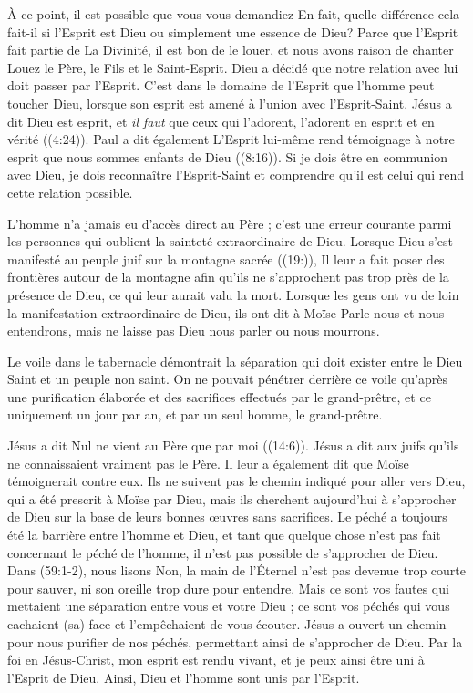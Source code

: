 À ce point, il est possible que vous vous demandiez\frcolon{}
 \Og En fait, quelle différence cela fait-il si l'Esprit est Dieu
 ou simplement une essence de Dieu? \Fg{}
 Parce que l'Esprit fait partie de La Divinité, il est bon de le louer,
 et nous avons raison de chanter\frcolon{}
 \Og Louez le Père, le Fils et le Saint-Esprit. \Fg{}
 Dieu a décidé que notre relation avec lui doit passer par
 l'Esprit. C'est dans le domaine de l'Esprit que l'homme peut toucher Dieu, lorsque
 son esprit est amené à l'union avec l'Esprit-Saint. Jésus a dit\frcolon{}
 \Og Dieu est esprit, et \emph{il faut} que ceux qui l'adorent, l'adorent en esprit
 et en vérité \Fg{} ((4:24)).
 Paul a dit également\frcolon{} \Og L'Esprit lui-même rend témoignage à notre esprit
 que nous sommes enfants de Dieu \Fg{} ((8:16)).
 Si je dois être en communion avec Dieu, je dois reconnaître l'Esprit-Saint
 et comprendre qu'il est celui qui rend cette relation possible.

L'homme n'a jamais eu d'accès direct au Père ; c'est une erreur courante parmi
 les personnes qui oublient la sainteté extraordinaire de Dieu.
 Lorsque Dieu s'est manifesté au peuple juif sur la montagne sacrée
 ((19:)), Il leur a fait poser des frontières autour de
 la montagne afin qu'ils ne s'approchent pas trop près de la présence
 de Dieu, ce qui leur aurait valu la mort.
 Lorsque les gens ont vu de loin la manifestation extraordinaire de Dieu,
 ils ont dit à Moïse\frcolon{}
 \Og Parle-nous et nous entendrons, mais ne laisse pas Dieu nous parler
 ou nous mourrons. \Fg{}

Le voile dans le tabernacle démontrait la séparation qui doit exister entre
 le Dieu Saint et un peuple non saint.
 On ne pouvait pénétrer derrière ce voile qu'après une purification élaborée
 et des sacrifices effectués par le grand-prêtre, et ce uniquement un jour par an,
 et par un seul homme, le grand-prêtre.

Jésus a dit\frcolon{} \Og Nul ne vient au Père que par moi \Fg{}
 ((14:6)).
 Jésus a dit aux juifs qu'ils ne connaissaient vraiment pas le Père.
 Il leur a également dit que Moïse témoignerait contre eux.
 Ils ne suivent pas le chemin indiqué pour aller vers Dieu, qui a été prescrit
 à Moïse par Dieu, mais ils cherchent aujourd'hui à s'approcher de Dieu
 sur la base de leurs bonnes œuvres sans sacrifices.
 Le péché a toujours été la barrière entre l'homme et Dieu, et tant
 que quelque chose n'est pas fait concernant le péché de l'homme,
 il n'est pas possible de s'approcher de Dieu.
 Dans (59:1-2), nous lisons\frcolon{}
 \Og Non, la main de l'Éternel n'est pas devenue trop courte pour sauver,
 ni son oreille trop dure pour entendre.
 Mais ce sont vos fautes qui mettaient une séparation entre vous et votre Dieu ;
 ce sont vos péchés qui vous cachaient (sa) face et l'empêchaient
 de vous écouter. \Fg{}
 Jésus a ouvert un chemin pour nous purifier de nos péchés,
 permettant ainsi de s'approcher de Dieu.
 Par la foi en Jésus-Christ, mon esprit est rendu vivant, et je peux ainsi
 être uni à l'Esprit de Dieu. Ainsi, Dieu et l'homme sont unis par l'Esprit.
\closechapter


